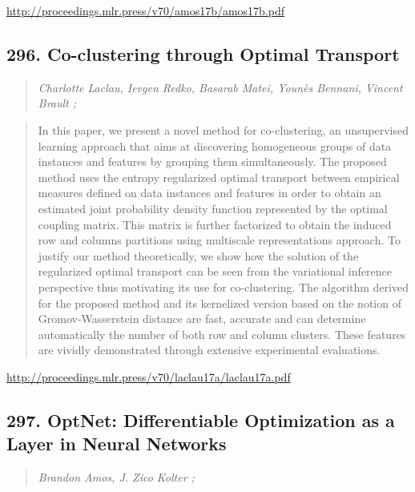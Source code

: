 \documentclass{article}
\begin{document}
\href{http://proceedings.mlr.press/v70/amos17b/amos17b.pdf}{http://proceedings.mlr.press/v70/amos17b/amos17b.pdf}

\subsection{296. Co-clustering through Optimal Transport}

\begin{quote}
\footnotesize{\textit{Charlotte Laclau, Ievgen Redko, Basarab Matei, Younès Bennani, Vincent Brault ;}}
\end{quote}

\begin{quote}
    In this paper, we present a novel method for co-clustering, an unsupervised learning approach that aims at discovering homogeneous groups of data instances and features by grouping them simultaneously. The proposed method uses the entropy regularized optimal transport between empirical measures defined on data instances and features in order to obtain an estimated joint probability density function represented by the optimal coupling matrix. This matrix is further factorized to obtain the induced row and columns partitions using multiscale representations approach. To justify our method theoretically, we show how the solution of the regularized optimal transport can be seen from the variational inference perspective thus motivating its use for co-clustering. The algorithm derived for the proposed method and its kernelized version based on the notion of Gromov-Wasserstein distance are fast, accurate and can determine automatically the number of both row and column clusters. These features are vividly demonstrated through extensive experimental evaluations.  \end{quote}

\href{http://proceedings.mlr.press/v70/laclau17a/laclau17a.pdf}{http://proceedings.mlr.press/v70/laclau17a/laclau17a.pdf}

\subsection{297. OptNet: Differentiable Optimization as a Layer in Neural Networks}

\begin{quote}
\footnotesize{\textit{Brandon Amos, J. Zico Kolter ;}}
\end{quote}
\end{document}
